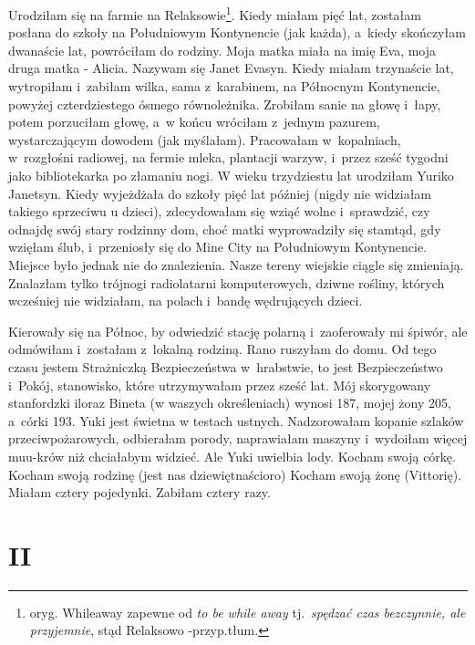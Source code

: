 \documentclass[oneside,polish,12pt,sfheadings]{mwbk}
\begin{document}
Urodziłam się na farmie na Relaksowie\footnote{oryg. Whileaway zapewne od \textit{to be while away} tj.~\textit{spędzać czas bezczynnie, ale przyjemnie}, stąd Relaksowo -przyp.tłum.}. Kiedy miałam pięć lat, zostałam posłana do szkoły na Południowym Kontynencie (jak każda), a~kiedy skończyłam dwanaście lat, powróciłam do rodziny. Moja matka miała na imię Eva, moja druga matka - Alicia. Nazywam się Janet Evasyn. Kiedy miałam trzynaście lat, wytropiłam i~zabiłam wilka, sama z~karabinem, na Północnym Kontynencie, powyżej czterdziestego ósmego równoleżnika. Zrobiłam sanie na głowę i~łapy, potem porzuciłam głowę, a~w końcu wróciłam z~jednym pazurem, wystarczającym dowodem (jak myślałam). Pracowałam w~kopalniach, w~rozgłośni radiowej, na fermie mleka, plantacji warzyw, i~przez sześć tygodni jako bibliotekarka po złamaniu nogi. W wieku trzydziestu lat urodziłam Yuriko Janetsyn. Kiedy wyjeżdżała do szkoły pięć lat później (nigdy nie widziałam takiego sprzeciwu u dzieci), zdecydowałam się wziąć wolne i~sprawdzić, czy odnajdę swój stary rodzinny dom, choć matki wyprowadziły się stamtąd, gdy wzięłam ślub, i~przeniosły się do Mine City na Południowym Kontynencie. Miejsce było jednak nie do znalezienia. Nasze tereny wiejskie ciągle się zmieniają. Znalazłam tylko trójnogi radiolatarni komputerowych, dziwne rośliny, których wcześniej nie widziałam, na polach i~bandę wędrujących dzieci.

Kierowały się na Północ, by odwiedzić stację polarną i~zaoferowały
mi śpiwór, ale odmówiłam i~zostałam z~lokalną rodziną. Rano ruszyłam
do domu. Od tego czasu jestem Strażniczką Bezpieczeństwa w~hrabstwie,
to jest Bezpieczeństwo i~Pokój, stanowisko, które utrzymywałam
przez sześć lat. Mój skorygowany stanfordzki iloraz Bineta (w waszych
określeniach) wynosi 187, mojej żony 205, a~córki 193. Yuki jest świetna
w testach ustnych. Nadzorowałam kopanie szlaków przeciwpożarowych,
odbierałam porody, naprawiałam maszyny i~wydoiłam więcej muu-krów
niż chciałabym widzieć. Ale Yuki uwielbia lody. Kocham swoją córkę.
Kocham swoją rodzinę (jest nas dziewiętnaścioro) Kocham swoją żonę
(Vittorię). Miałam cztery pojedynki. Zabiłam cztery razy.

\chapter{II}
\end{document}
